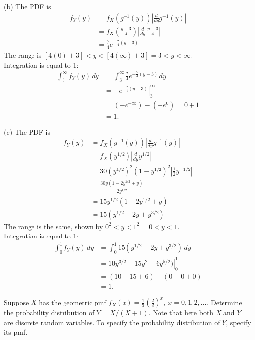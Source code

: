 \documentclass[12pt,letterpaper]{exam}
\begin{document}
\begin{questions}
\begin{solution}
		
		(b)
		The PDF is
		\begin{align*}
			f_Y(y) &= f_X(g^{-1}(y)) \left|\frac{d}{dy}g^{-1}(y) \right| \\
			&= f_X( \frac{y-3}{4} ) \left|\frac{d}{dy}\,\frac{y-3}{4}  \right| \\
			&= \frac{7}{4}e^{-\frac{7}{4}(y-3)}
		\end{align*}
		The range is $ \left[4(0)+3\right] < y < \left[4(\infty)+3\right] = 3 < y < \infty$. \\
		Integration is equal to 1:
		\begin{align*}
			\int_{3}^{\infty}f_Y(y) \,dy
			&= \int_{3}^{\infty} \frac{7}{4}e^{-\frac{7}{4}(y-3)} \,dy \\
			&= \left. -e^{-\frac{7}{4}(y-3)} \right|_3^\infty \\
			&= (-e^{-\infty}) - (-e^0)
			= 0 + 1 \\
			&= 1.
		\end{align*}
		
		(c)
		The PDF is
		\begin{align*}
			f_Y(y) &= f_X(g^{-1}(y)) \left|\frac{d}{dy}g^{-1}(y) \right| \\
			&= f_X( y^{1/2} ) \left|\frac{d}{dy} y^{1/2} \right| \\
			&=  30(y^{1/2})^2(1-y^{1/2})^2  \left|\frac{1}{2} y^{-1/2} \right| \\
			&= \frac{ 30y(1-2y^{1/2} + y) }{2y^{1/2}} \\
			&= 15y^{1/2}(1-2y^{1/2} + y) \\
			&= 15(y^{1/2}-2y + y^{3/2})
		\end{align*}
		The range is the same, shown by $ 0^{2} < y < 1^{2} = 0 < y < 1$. \\
		Integration is equal to 1:
		\begin{align*}
			\int_{0}^{1}f_Y(y) \,dy
			&= \int_{0}^{1} 15(y^{1/2}-2y + y^{3/2}) \,dy \\
			&= \left. 10y^{3/2}-15y^2 + 6y^{5/2}) \right|_0^1 \\
			&= (10-15+6) - (0-0+0) \\
			&= 1.
		\end{align*}
		
	\end{solution}
	
	\setcounter{question}{2}
	\question Suppose $X$ has the geometric pmf $f_X(x) = \frac{1}{3} \left(\frac{2}{3}\right)^{x}, \ x = 0,1,2,...$. Determine the probability distribution of $Y= X/(X+1)$. 
	Note that here both $X$ and $Y$ are discrete random variables. To specify the probability distribution of $Y$, specify its pmf.
	

\end{questions}
\end{document}
